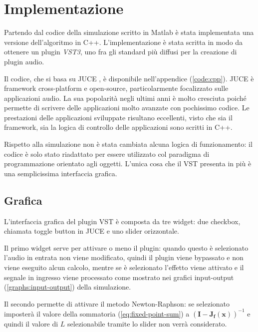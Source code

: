 \chapter{Implementazione}
	\label{sec:implementazione}
	Partendo dal codice della simulazione scritto in Matlab è stata implementata una versione dell'algoritmo in C++. L'implementazione è stata scritta in modo da ottenere un plugin \textit{VST3}, uno fra gli standard più diffusi per la creazione di plugin audio.
	
	Il codice, che si basa su JUCE \cite{juce}, è disponibile nell'appendice (\ref{code:cpp}). JUCE è framework cross-platform e open-source, particolarmente focalizzato sulle applicazioni audio. La sua popolarità negli ultimi anni è molto cresciuta poiché permette di scrivere delle applicazioni molto avanzate con pochissimo codice. Le prestazioni delle applicazioni sviluppate risultano eccellenti, visto che sia il framework, sia la logica di controllo delle applicazioni sono scritti in C++.
	
	Rispetto alla simulazione non è stata cambiata alcuna logica di funzionamento: il codice è solo stato riadattato per essere utilizzato col paradigma di programmazione orientato agli oggetti. L'unica cosa che il VST presenta in più è una semplicissima interfaccia grafica.
	\pagebreak
	
	\section{Grafica}
		L'interfaccia grafica del plugin VST è composta da tre widget: due checkbox, chiamata toggle button in JUCE e uno slider orizzontale.
		
		
		Il primo widget serve per attivare o meno il plugin: quando questo è selezionato l'audio in entrata non viene modificato, quindi il plugin viene bypassato e non viene eseguito alcun calcolo, mentre se è selezionato l'effetto viene attivato e il segnale in ingresso viene processato come mostrato nei grafici input-output (\ref{graphs:input-output}) della simulazione.
		
		Il secondo permette di attivare il metodo Newton-Raphson: se selezionato imposterà il valore della sommatoria (\ref{eq:fixed-point-sum}) a $(\mathbf{I}-\mathbf{J_{f}(x)})^{-1}$ e quindi il valore di $L$ selezionabile tramite lo slider non verrà considerato.
		
		
